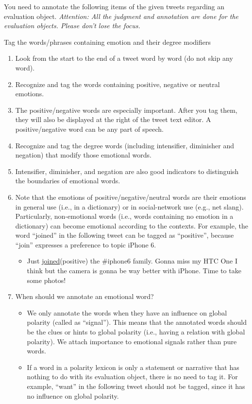 \documentclass[english]{jnlp_1.4}
\begin{document}
\vspace{1\Cvs}

\noindent You need to annotate the following items of the given tweets regarding an evaluation object. {\em *Attention: All the judgment and annotation are done for the evaluation objects. Please don't lose the focus.} 
\begin{enumerate}
\renewcommand{\labelenumii}{}
	
	{\bf \item Tag the words/phrases containing emotion and their degree modifiers}
	\begin{enumerate}
		\item Look from the start to the end of a tweet word by word (do not skip any word).
		\item Recognize and tag the words containing positive, negative or neutral emotions.
		\item The positive/negative words are especially important. After you tag them, they will also be displayed at the right of the tweet text editor. A positive/negative word can be any part of speech.
		\item Recognize and tag the degree words (including intensifier, diminisher and negation) that modify those emotional words.
		\item Intensifier, diminisher, and negation are also good indicators to distinguish the boundaries of emotional words.
		\item Note that the emotions of positive/negative/neutral words are their emotions in general use (i.e., in a dictionary) or in social-network use (e.g., net slang). Particularly, non-emotional words (i.e., words containing no emotion in a dictionary) can become emotional according to the contexts. For example, the word ``joined'' in the following tweet can be tagged as ``positive'', because ``join'' expresses a preference to topic iPhone 6.
                   
			\begin{itemize}
                    	\item[\CheckedBox] {\sffamily Just \underline{joined}{\boldsf (positive)} the \#iphone6 family. Gonna miss my HTC One I think but the camera is gonna be way better with iPhone. Time to take some photos!}
                   \end{itemize}
		\item When should we annotate an emotional word?
		\begin{itemize}
			\item We only annotate the words when they have an influence on global polarity (called as ``signal''). This means that the annotated words should be the clues or hints to global polarity (i.e., having a relation with global polarity). We attach importance to emotional signals rather than pure words.
			\item If a word in a polarity lexicon is only a statement or narrative that has nothing to do with its evaluation object, there is no need to tag it. For example, ``want'' in the following tweet should not be tagged, since it has no influence on global polarity.
				  

\end{itemize}
\end{enumerate}
\end{enumerate}
\end{document}
